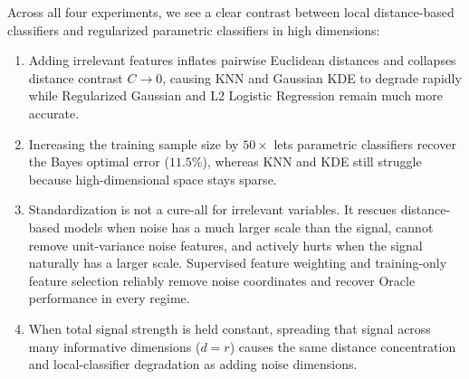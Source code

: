 \documentclass[11pt, a4paper]{article}
\begin{document}
Across all four experiments, we see a clear contrast between local distance-based classifiers and regularized parametric classifiers in high dimensions:
\begin{enumerate}
    \item Adding irrelevant features inflates pairwise Euclidean distances and collapses distance contrast $C \to 0$, causing KNN and Gaussian KDE to degrade rapidly while Regularized Gaussian and L2 Logistic Regression remain much more accurate.
    \item Increasing the training sample size by $50\times$ lets parametric classifiers recover the Bayes optimal error ($11.5\%$), whereas KNN and KDE still struggle because high-dimensional space stays sparse.
    \item Standardization is not a cure-all for irrelevant variables. It rescues distance-based models when noise has a much larger scale than the signal, cannot remove unit-variance noise features, and actively hurts when the signal naturally has a larger scale. Supervised feature weighting and training-only feature selection reliably remove noise coordinates and recover Oracle performance in every regime.
    \item When total signal strength is held constant, spreading that signal across many informative dimensions ($d=r$) causes the same distance concentration and local-classifier degradation as adding noise dimensions.
\end{enumerate}
\end{document}
